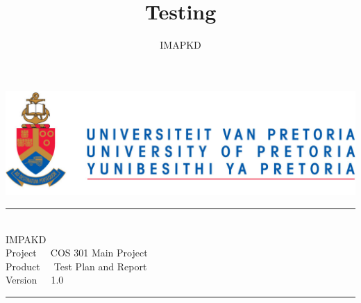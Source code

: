 \documentclass[a4paper,12pt]{article}
\author{IMAPKD}
\title{ Testing}
\newcommand{\HRule}{\rule{\linewidth}{0.5mm}}
\begin{document}
\setlength{\parskip}{6pt}

\begin{titlepage}

\begin{center}
\includegraphics[width=1\textwidth]{./University_of_Pretoria_Logo.PNG}\\[0.4cm]  


\HRule \\[0.4cm]
{\LARGE IMPAKD}\\[0.8cm]
{\LARGE Project $\>$ $\>$   COS 301 Main Project}\\[0.5cm]
{\LARGE Product $\>$ $\>$  Test Plan and Report}\\[0.8cm]
{\LARGE Version $\>$ $\>$  1.0}\\
\HRule \\[4cm]  






\end{center}
\end{titlepage}
\end{document}
